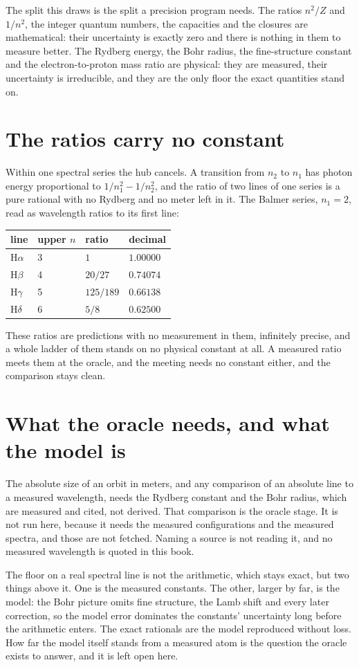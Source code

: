 The split this draws is the split a precision program needs. The ratios $n^2/Z$ and $1/n^2$, the
integer quantum numbers, the capacities and the closures are mathematical: their uncertainty is
exactly zero and there is nothing in them to measure better. The Rydberg energy, the Bohr radius, the
fine-structure constant and the electron-to-proton mass ratio are physical: they are measured, their
uncertainty is irreducible, and they are the only floor the exact quantities stand on.

\section{The ratios carry no constant}

Within one spectral series the hub cancels. A transition from $n_2$ to $n_1$ has photon energy
proportional to $1/n_1^2 - 1/n_2^2$, and the ratio of two lines of one series is a pure rational with
no Rydberg and no meter left in it. The Balmer series, $n_1 = 2$, read as wavelength ratios to its
first line:

\begin{center}
\begin{tabular}{@{}llll@{}}
\toprule
line & upper $n$ & ratio & decimal \\
\midrule
H$\alpha$ & 3 & $1$      & $1.00000$ \\
H$\beta$  & 4 & $20/27$  & $0.74074$ \\
H$\gamma$ & 5 & $125/189$& $0.66138$ \\
H$\delta$ & 6 & $5/8$    & $0.62500$ \\
\bottomrule
\end{tabular}
\end{center}

\noindent These ratios are predictions with no measurement in them, infinitely precise, and a whole
ladder of them stands on no physical constant at all. A measured ratio meets them at the oracle, and
the meeting needs no constant either, and the comparison stays clean.

\section{What the oracle needs, and what the model is}

The absolute size of an orbit in meters, and any comparison of an absolute line to a measured
wavelength, needs the Rydberg constant and the Bohr radius, which are measured and cited, not derived.
That comparison is the oracle stage. It is not run here, because it needs the measured
configurations and the measured spectra, and those are not fetched. Naming a source is not reading
it, and no measured wavelength is quoted in this book.

The floor on a real spectral line is not the arithmetic, which stays exact, but two things above it.
One is the measured constants. The other, larger by far, is the model: the Bohr picture omits fine
structure, the Lamb shift and every later correction, so the model error dominates the constants'
uncertainty long before the arithmetic enters. The exact rationals are the model reproduced without
loss. How far the model itself stands from a measured atom is the question the oracle exists to
answer, and it is left open here.
